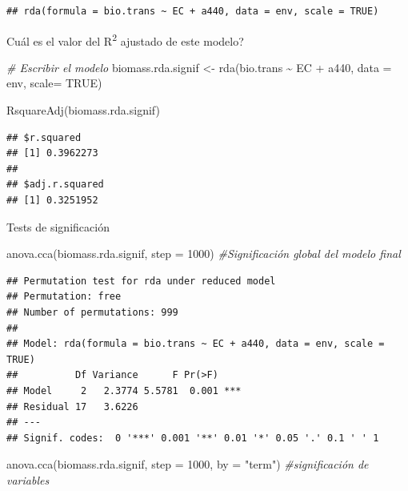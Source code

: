\documentclass[
]{book}
\newenvironment{Shaded}{\begin{snugshade}}{\end{snugshade}}
\newcommand{\AttributeTok}[1]{\textcolor[rgb]{0.77,0.63,0.00}{#1}}
\newcommand{\CommentTok}[1]{\textcolor[rgb]{0.56,0.35,0.01}{\textit{#1}}}
\newcommand{\ConstantTok}[1]{\textcolor[rgb]{0.00,0.00,0.00}{#1}}
\newcommand{\DecValTok}[1]{\textcolor[rgb]{0.00,0.00,0.81}{#1}}
\newcommand{\FunctionTok}[1]{\textcolor[rgb]{0.00,0.00,0.00}{#1}}
\newcommand{\NormalTok}[1]{#1}
\newcommand{\OtherTok}[1]{\textcolor[rgb]{0.56,0.35,0.01}{#1}}
\newcommand{\SpecialCharTok}[1]{\textcolor[rgb]{0.00,0.00,0.00}{#1}}
\newcommand{\StringTok}[1]{\textcolor[rgb]{0.31,0.60,0.02}{#1}}
\begin{document}
\begin{verbatim}
## rda(formula = bio.trans ~ EC + a440, data = env, scale = TRUE)
\end{verbatim}

Cuál es el valor del R\textsuperscript{2} ajustado de este modelo?

\begin{Shaded}
\begin{Highlighting}[]
\CommentTok{\# Escribir el modelo}
\NormalTok{biomass.rda.signif }\OtherTok{\textless{}{-}} \FunctionTok{rda}\NormalTok{(bio.trans }\SpecialCharTok{\textasciitilde{}}\NormalTok{ EC }\SpecialCharTok{+}\NormalTok{ a440, }\AttributeTok{data =}\NormalTok{ env, }\AttributeTok{scale=} \ConstantTok{TRUE}\NormalTok{)}


\FunctionTok{RsquareAdj}\NormalTok{(biomass.rda.signif)}
\end{Highlighting}
\end{Shaded}

\begin{verbatim}
## $r.squared
## [1] 0.3962273
## 
## $adj.r.squared
## [1] 0.3251952
\end{verbatim}

Tests de significación

\begin{Shaded}
\begin{Highlighting}[]
\FunctionTok{anova.cca}\NormalTok{(biomass.rda.signif, }\AttributeTok{step =} \DecValTok{1000}\NormalTok{) }\CommentTok{\#Significación global del modelo final}
\end{Highlighting}
\end{Shaded}

\begin{verbatim}
## Permutation test for rda under reduced model
## Permutation: free
## Number of permutations: 999
## 
## Model: rda(formula = bio.trans ~ EC + a440, data = env, scale = TRUE)
##          Df Variance      F Pr(>F)    
## Model     2   2.3774 5.5781  0.001 ***
## Residual 17   3.6226                  
## ---
## Signif. codes:  0 '***' 0.001 '**' 0.01 '*' 0.05 '.' 0.1 ' ' 1
\end{verbatim}

\begin{Shaded}
\begin{Highlighting}[]
\FunctionTok{anova.cca}\NormalTok{(biomass.rda.signif, }\AttributeTok{step =} \DecValTok{1000}\NormalTok{, }\AttributeTok{by =} \StringTok{"term"}\NormalTok{) }\CommentTok{\#significación de variables }
\end{Highlighting}
\end{Shaded}
\end{document}
